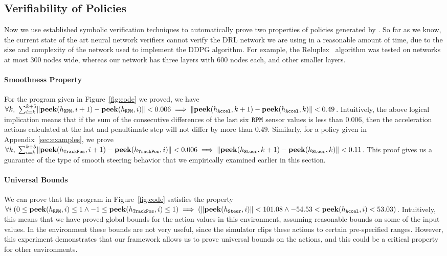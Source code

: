 \subsection{Verifiability of Policies}
Now we use established symbolic verification techniques to automatically prove two properties of policies generated by \algo. So far as we know, the current state of the art neural network verifiers cannot verify the DRL network we are using in a reasonable amount of time, due to the size and complexity of the network used to implement the DDPG algorithm. For example, the Reluplex~\cite{reluplex} algorithm was tested on networks at most 300 nodes wide, whereas our network has three layers with 600 nodes each, and other smaller layers.

\paragraph{Smoothness Property} For the program given in Figure~\ref{fig:code} we proved, we have $  \forall k, \ \sum_{i=k}^{k+5}\norm{\pickc(h_\rpm, i+1) - \pickc(h_\rpm, i)} < 0.006  \implies  \norm{\pickc(h_{\mathtt{Accel}}, k+1) - \pickc(h_{\mathtt{Accel}}, k)} < 0.49 $. Intuitively, the above logical implication means that if the sum of the consecutive differences of the last six $\mathtt{RPM}$ sensor values is less than $0.006$, then the acceleration actions calculated at the last and penultimate step will not differ by more than $0.49$. Similarly, for a policy given in Appendix~\ref{sec:examples}, we prove $  \forall k, \; \sum_{i=k}^{k+5}\lVert\mathbf{peek}(h_{\mathtt{TrackPos}}, i+1) - \mathbf{peek}(h_{\mathtt{TrackPos}}, i)\rVert < 0.006 \implies \lVert\mathbf{peek}(h_{\mathtt{Steer}}, k+1) - \mathbf{peek}(h_{\mathtt{Steer}}, k)\rVert < 0.11$. This proof gives us a guarantee of the type of smooth steering behavior that we empirically examined earlier in this section. 

\paragraph{Universal Bounds} We can prove that the program in Figure~\ref{fig:code} satisfies the property $  \forall i \; (0 \leq \mathbf{peek}(h_{\mathtt{RPM}}, i) \leq 1 \wedge -1 \leq \mathbf{peek}(h_{\mathtt{TrackPos}}, i) \leq 1) \implies (\lVert\mathbf{peek}(h_\mathtt{Steer}, i)\rVert < 101.08 \wedge -54.53 < \mathbf{peek}(h_\mathtt{Accel}, i) < 53.03)$.  Intuitively, this means that we have proved global bounds for the action values in this environment, assuming reasonable bounds on some of the input values. In the \torcs environment these bounds are not very useful, since the simulator clips these actions to certain pre-specified ranges. However, this experiment demonstrates that our framework allows us to prove universal bounds on the actions, and this could be a critical property for other environments.